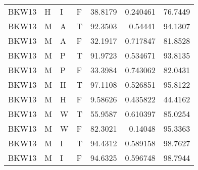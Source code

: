 \begin{longtable}{llllrrr}
    BKW13    & H         & I         & F          & 38.8179    & 0.240461    & 76.7449  \\
    BKW13    & M         & A         & T          & 92.3503    & 0.54441     & 94.1307  \\
    BKW13    & M         & A         & F          & 32.1917    & 0.717847    & 81.8528  \\
    BKW13    & M         & P         & T          & 91.9723    & 0.534671    & 93.8135  \\
    BKW13    & M         & P         & F          & 33.3984    & 0.743062    & 82.0431  \\
    BKW13    & M         & H         & T          & 97.1108    & 0.526851    & 95.8122  \\
    BKW13    & M         & H         & F          & 9.58626    & 0.435822    & 44.4162  \\
    BKW13    & M         & W         & T          & 55.9587    & 0.610397    & 85.0254  \\
    BKW13    & M         & W         & F          & 82.3021    & 0.14048     & 95.3363  \\
    BKW13    & M         & I         & T          & 94.4312    & 0.589158    & 98.7627  \\
    BKW13    & M         & I         & F          & 94.6325    & 0.596748    & 98.7944  \\
    \hline
\end{longtable}